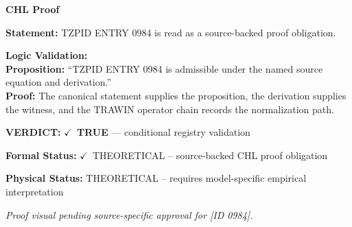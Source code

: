 \vspace{0.45em}
\noindent\textbf{CHL Proof}\par
\textbf{Statement:} TZPID ENTRY 0984 is read as a source-backed proof obligation.

\textbf{Logic Validation:}\\
\textbf{Proposition:} ``TZPID ENTRY 0984 is admissible under the named source equation and derivation.''\\
\textbf{Proof:} The canonical statement supplies the proposition, the derivation supplies the witness, and the TRAWIN operator chain records the normalization path.

\textbf{VERDICT:} \ensuremath{\checkmark}\ \textbf{TRUE} --- conditional registry validation

\textbf{Formal Status:} \ensuremath{\checkmark}\ THEORETICAL -- source-backed CHL proof obligation

\textbf{Physical Status:} THEORETICAL -- requires model-specific empirical interpretation
\par\vspace{0.45em}
\par
\vfill
\begingroup\footnotesize\itshape
Proof visual pending source-specific approval for [ID 0984].
\par\endgroup
\vfill
\endgroup
\endgroup
